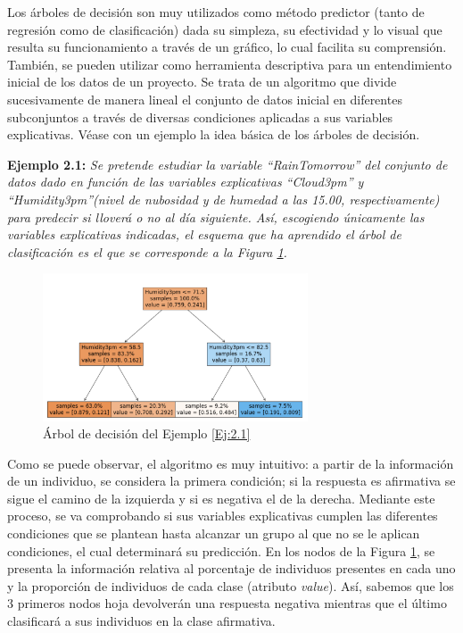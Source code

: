 \documentclass[12pt,twoside]{article}
\begin{document}
Los árboles de decisión son muy utilizados como método predictor (tanto de regresión como de clasificación) dada su simpleza, su efectividad y lo visual que resulta su funcionamiento a través de un gráfico, lo cual facilita su comprensión. También, se pueden utilizar como herramienta descriptiva para un entendimiento inicial de los datos de un proyecto. Se trata de un algoritmo que divide sucesivamente de manera lineal el conjunto de datos inicial en diferentes subconjuntos a través de diversas condiciones aplicadas a sus variables explicativas. Véase con un ejemplo la idea básica de los árboles de decisión.

\textbf{Ejemplo 2.1: } \label{Ej:2.1} \emph{Se pretende estudiar la variable ``RainTomorrow'' del conjunto de datos dado en función de las variables explicativas ``Cloud3pm'' y ``Humidity3pm''(nivel de nubosidad y de humedad a las 15.00, respectivamente) para predecir si lloverá o no al día siguiente. Así, escogiendo únicamente las variables explicativas indicadas, el esquema que ha aprendido el árbol de clasificación es el que se corresponde a la Figura \ref{fig:Ejemplo 2.1}. }
\begin{figure}[h]
	\centering
	\includegraphics[width = 0.7\textwidth]{ex2_1_01}
	\caption{Árbol de decisión del Ejemplo \ref{Ej:2.1}}
	\label{fig:Ejemplo 2.1}
\end{figure}

Como se puede observar, el algoritmo es muy intuitivo: a  partir de la información de un individuo, se considera la primera condición; si la respuesta es afirmativa se sigue el camino de la izquierda y si es negativa el de la derecha. Mediante este proceso, se va comprobando si sus variables explicativas cumplen las diferentes condiciones que se plantean hasta alcanzar un grupo al que no se le aplican condiciones, el cual determinará su predicción. En los nodos de la Figura \ref{fig:Ejemplo 2.1}, se presenta la información relativa al porcentaje de individuos presentes en cada uno y la proporción de individuos de cada clase (atributo \textit{value}). Así, sabemos que los 3 primeros nodos hoja devolverán una respuesta negativa mientras que el último clasificará a sus individuos en la clase afirmativa.
\end{document}
